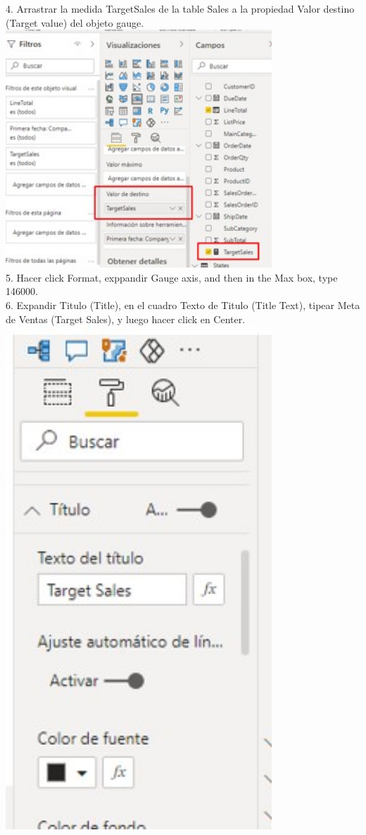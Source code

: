 \documentclass[preprint,12pt]{elsarticle}
\begin{document}
\begin{itemize}
			4. Arrastrar la medida TargetSales de la table Sales a la propiedad Valor destino (Target value) del objeto
			gauge.
				\\ \includegraphics[width=10cm]{./IMAGENES/4.4} \\
			5. Hacer click Format, exppandir Gauge axis, and then in the Max box, type 146000.
			\\ 6. Expandir Titulo (Title), en el cuadro Texto de Titulo (Title Text), tipear Meta de Ventas (Target Sales), y
			luego hacer click en Center.
				\\ \includegraphics[width=10cm]{./IMAGENES/4.6} \\

\end{itemize}
\end{document}
